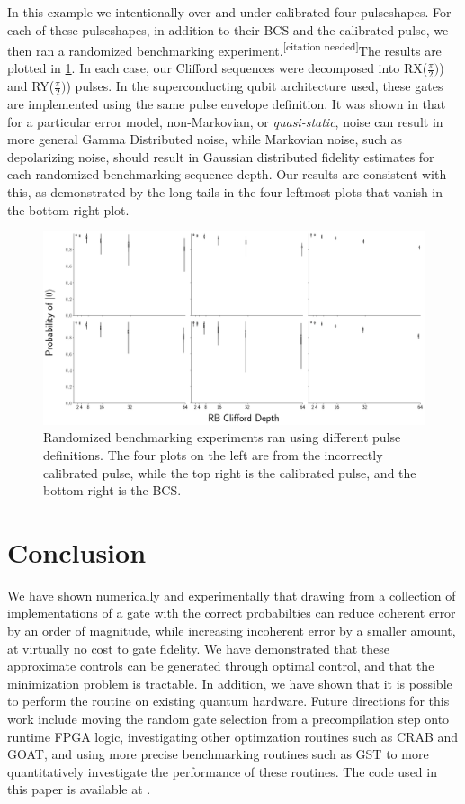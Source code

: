 \documentclass[aps,nofootinbib,pra,notitlepage,twocolumn]{revtex4-1}
\newcommand{\needcite}{{\color{blue}\textsuperscript{[citation needed]}}}
\begin{document}
In this example we intentionally over and under-calibrated four pulseshapes. For each of these pulseshapes, in addition to their BCS and the calibrated pulse, we then ran a randomized benchmarking experiment.\needcite The results are plotted in \ref{fig:rb}. In each case, our Clifford sequences were decomposed into RX($\frac{\pi}{2})$) and RY($\frac{\pi}{2})$) pulses.  In the superconducting qubit architecture used, these gates are implemented using the same pulse envelope definition. It was shown in \cite{Ball2016} that for a particular error model, non-Markovian, or \textit{quasi-static}, noise can result in more general Gamma Distributed noise, while Markovian noise, such as depolarizing noise, should result in Gaussian distributed fidelity estimates for each randomized benchmarking sequence depth. Our results are consistent with this, as demonstrated by the long tails in the four leftmost plots that vanish in the bottom right plot.

\begin{figure}[H]
  \centering
  \includegraphics[width=\columnwidth]{placeholder_rb.png}
  \caption{Randomized benchmarking experiments ran using different pulse definitions. The four plots on the left are from the incorrectly calibrated pulse, while the top right is the calibrated pulse, and the bottom right is the BCS.}
  \label{fig:rb}
\end{figure}

\section{Conclusion}
We have shown numerically and experimentally that drawing from a collection of implementations of a gate with the correct probabilties can reduce coherent error by an order of magnitude, while increasing incoherent error by a smaller amount, at virtually no cost to gate fidelity. We have demonstrated that these approximate controls can be generated through optimal control, and that the minimization problem is tractable. In addition, we have shown that it is possible to perform the routine on existing quantum hardware. Future directions for this work include moving the random gate selection from a precompilation step onto runtime FPGA logic, investigating other optimzation routines such as CRAB \cite{Caneva2011} and GOAT\cite{Machnes2018}, and using more precise benchmarking routines such as GST\cite{BlumeKohout2017} to more quantitatively investigate the performance of these routines. The code used in this paper is available at \cite{decorrelating_errors}.
\end{document}
